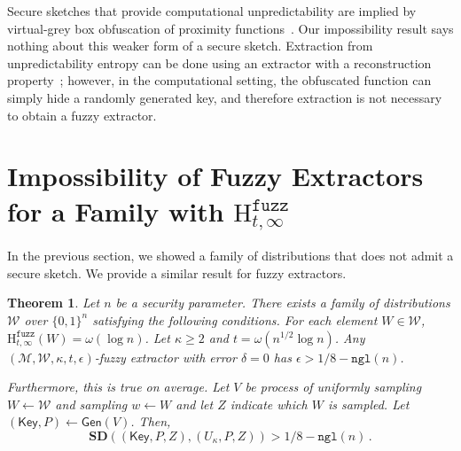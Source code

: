 \documentclass[11pt]{article}
\newcommand{\class}[1]{{\ensuremath{\mathsf{#1}}}}
\newcommand{\Key}{\ensuremath{\class{Key}}\xspace}
\newcommand{\gen}{\ensuremath{\class{Gen}}\xspace}
\newcommand{\zo}{\ensuremath{\{0, 1\}}}
\newcommand{\ngl}{\ensuremath{\mathtt{ngl}}\xspace}
\newcommand{\Hfuzz}{\mathrm{H}^{\mathtt{fuzz}}_{t,\infty}}
\newcommand{\sd}{\ensuremath{\mathbf{SD}}}
\newtheorem{theorem}{Theorem}[section]
\begin{document}
Secure sketches that provide computational unpredictability are implied by virtual-grey box obfuscation of proximity functions~\cite{BitanskyCKP14}.  Our impossibility result says nothing about this weaker form of a secure sketch.  Extraction from unpredictability entropy can be done using an extractor with a reconstruction property~\cite{barak-computational, DBLP:conf/eurocrypt/HsiaoLR07}; however, in the computational setting, the obfuscated function can simply hide a randomly generated key, and therefore extraction is not necessary to obtain a fuzzy extractor.

\section{Impossibility of Fuzzy Extractors for a Family with $\Hfuzz$}
\label{sec:imposs fuzz ext}
In the previous section, we showed a family of distributions that does not admit a secure sketch.  We provide a similar result for fuzzy extractors.  

\begin{theorem}
\label{thm:imposs fuzz ext}
Let $n$ be a security parameter.  There exists a family of distributions $\mathcal{W}$ over $\zo^n$ satisfying the following conditions. For each element $W\in \mathcal{W}$, $\Hfuzz(W)= \omega(\log n)$. Let $\kappa \ge 2$ and $t = \omega(n^{1/2}\log n)$.  Any $(\mathcal{M}, \mathcal{W}, \kappa, t, \epsilon)$-fuzzy extractor with error $\delta = 0$ has $\epsilon > 1/8 - \ngl(n)$.

Furthermore, this is true on average.  Let $V$ be process of uniformly sampling $W\leftarrow \mathcal{W}$ and sampling $w\leftarrow W$ and let $Z$ indicate which $W$ is sampled.  Let $(\Key, P)\leftarrow \gen(V)$.  Then, 
\[
\sd ((\Key,P, Z), (U_\kappa, P, Z))>1/8-\ngl(n)\,.
\]

\end{theorem}
\end{document}
